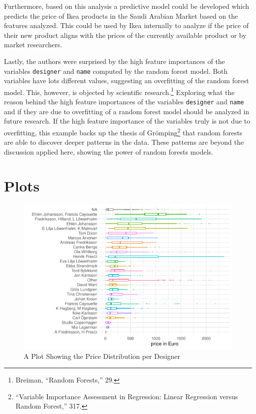 \documentclass[a4paper, nobind]{templates/ociamthesis}
\begin{document}
Furthermore, based on this analysis a predictive model could be developed which predicts the price of Ikea products in the Saudi Arabian Market based on the features analyzed. This could be used by Ikea internally to analyze if the price of their new product aligns with the prices of the currently available product or by market researchers.

Lastly, the authors were surprised by the high feature importances of the variables \texttt{designer} and \texttt{name} computed by the random forest model. Both variables have lots different values, suggesting an overfitting of the random forest model. This, however, is objected by scientific research.\footnote{Breiman, ``Random Forests,'' 29.}
Exploring what the reason behind the high feature importances of the variables \texttt{designer} and \texttt{name} and if they are due to overfitting of a random forest model should be analyzed in future research.
If the high feature importance of the variables truly is not due to overfitting, this example backs up the thesis of Grömping\footnote{``Variable Importance Assessment in Regression: Linear Regression versus Random Forest,'' 317.} that random forests are able to discover deeper patterns in the data. These patterns are beyond the discussion applied here, showing the power of random forests models.

\startappendices

\hypertarget{plots}{%
\chapter{Plots}\label{plots}}

\begin{figure}
\includegraphics[width=1\linewidth]{_main_files/figure-latex/price-dist-per-designer-1} \caption{A Plot Showing the Price Distribution per Designer}\label{fig:price-dist-per-designer}
\end{figure}
\end{document}
